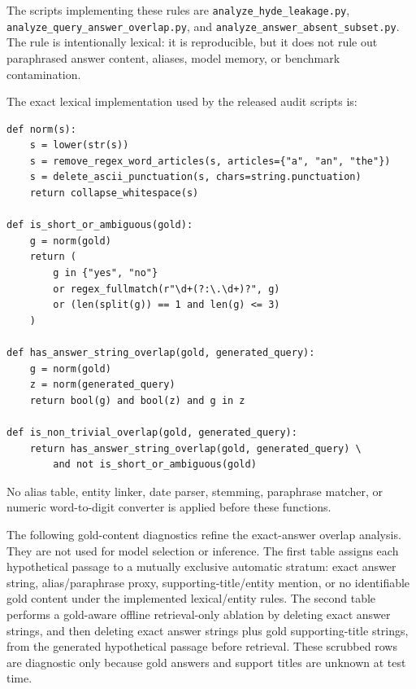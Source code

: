 \documentclass[10pt]{article}
\begin{document}
\begin{table}[t]
\begin{threeparttable}
\begin{tabularx}{\textwidth}{>{\raggedright\arraybackslash}p{}
                            >{\raggedright\arraybackslash}X}
\bottomrule
\end{tabularx}
\begin{tablenotes}
\footnotesize
\item The scripts implementing these rules are \texttt{analyze\_hyde\_leakage.py}, \texttt{analyze\_query\_answer\_overlap.py}, and \texttt{analyze\_answer\_absent\_subset.py}. The rule is intentionally lexical: it is reproducible, but it does not rule out paraphrased answer content, aliases, model memory, or benchmark contamination.
\end{tablenotes}
\end{threeparttable}
\end{table}

The exact lexical implementation used by the released audit scripts is:
\begingroup\footnotesize
\begin{verbatim}
def norm(s):
    s = lower(str(s))
    s = remove_regex_word_articles(s, articles={"a", "an", "the"})
    s = delete_ascii_punctuation(s, chars=string.punctuation)
    return collapse_whitespace(s)

def is_short_or_ambiguous(gold):
    g = norm(gold)
    return (
        g in {"yes", "no"}
        or regex_fullmatch(r"\d+(?:\.\d+)?", g)
        or (len(split(g)) == 1 and len(g) <= 3)
    )

def has_answer_string_overlap(gold, generated_query):
    g = norm(gold)
    z = norm(generated_query)
    return bool(g) and bool(z) and g in z

def is_non_trivial_overlap(gold, generated_query):
    return has_answer_string_overlap(gold, generated_query) \
        and not is_short_or_ambiguous(gold)
\end{verbatim}
\endgroup
No alias table, entity linker, date parser, stemming, paraphrase matcher, or
numeric word-to-digit converter is applied before these functions.





The following gold-content diagnostics refine the exact-answer overlap analysis. They are not used for model selection or inference. The first table assigns each hypothetical passage to a mutually exclusive automatic stratum: exact answer string, alias/paraphrase proxy, supporting-title/entity mention, or no identifiable gold content under the implemented lexical/entity rules. The second table performs a gold-aware offline retrieval-only ablation by deleting exact answer strings, and then deleting exact answer strings plus gold supporting-title strings, from the generated hypothetical passage before retrieval. These scrubbed rows are diagnostic only because gold answers and support titles are unknown at test time.
\end{document}
